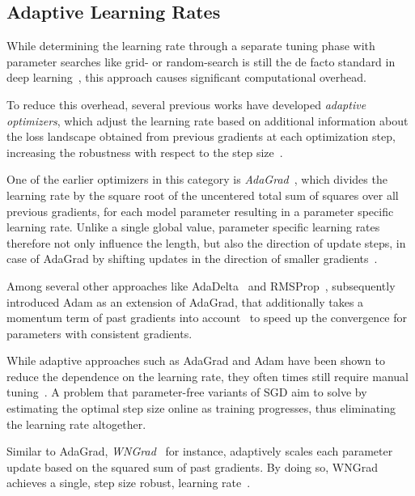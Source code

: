\documentclass[letterpaper]{article} %
\begin{document}
\subsection{Adaptive Learning Rates}

While determining the learning rate through a separate tuning phase with parameter searches like grid- or random-search is still the de facto standard in deep learning~\cite{defazioLearningRateFreeLearningDAdaptation2023a}, this approach causes significant computational overhead.

To reduce this overhead, several previous works have developed \textit{adaptive optimizers}, which adjust the learning rate based on additional information about the loss landscape obtained from previous gradients at each optimization step, increasing the robustness with respect to the step size~\cite{duchiAdaptiveSubgradientMethods2011}.

One of the earlier optimizers in this category is \textit{AdaGrad}~\cite{duchiAdaptiveSubgradientMethods2011}, which divides the learning rate by the square root of the uncentered total sum of squares over all previous gradients, for each model parameter resulting in a parameter specific learning rate.
Unlike a single global value, parameter specific learning rates therefore not only influence the length, but also the direction of update steps, in case of AdaGrad by shifting updates in the direction of smaller gradients~\cite{wuWNGradLearnLearning2020}. %

Among several other approaches like AdaDelta~\cite[see e.g.]{zeilerADADELTAAdaptiveLearning2012a} and RMSProp~\cite{tielemanLecture5rmspropDivide2012}, \citet{kingmaAdamMethodStochastic2017b} subsequently introduced Adam as an extension of AdaGrad, that additionally takes a momentum term of past gradients into account~\cite[see]{sutskeverImportanceInitializationMomentum2013} to speed up the convergence for parameters with consistent gradients.

While adaptive approaches such as AdaGrad and Adam have been shown to reduce the dependence on the learning rate, they often times still require manual tuning~\cite{wuWNGradLearnLearning2020}.
A problem that parameter-free variants of SGD aim to solve by estimating the optimal step size online as training progresses, thus eliminating the learning rate altogether.

Similar to AdaGrad, \textit{WNGrad}~\cite{wuWNGradLearnLearning2020} for instance, adaptively scales each parameter update based on the squared sum of past gradients.
By doing so, WNGrad achieves a single, step size robust, learning rate~\cite{wuWNGradLearnLearning2020}.
\end{document}
